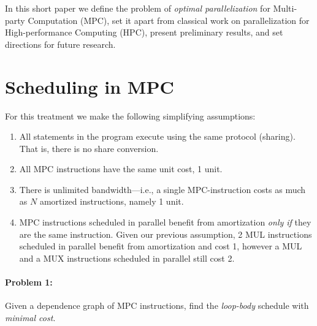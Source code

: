 \documentclass[sigconf, screen, natbib=false, dvipsnames, table]{acmart}
\theoremstyle{definition}
\begin{document}
In this short paper we define the problem of \emph{optimal parallelization} for Multi-party Computation (MPC), 
set it apart from classical work on parallelization for High-performance Computing (HPC), present preliminary 
results, and set directions for future research. 






\section{Scheduling in MPC}

For this treatment we make the following simplifying assumptions:

\begin{enumerate}
\item All statements in the program execute using the same protocol (sharing). That is, there is no share conversion.
\item All MPC instructions have the same unit cost, 1 unit.
\item There is unlimited bandwidth---i.e., a single MPC-instruction costs as much as $N$ amortized instructions, namely 1 unit.
\item MPC instructions scheduled in parallel benefit from amortization \emph{only if} they are the same instruction. Given our previous assumption, 
2 MUL instructions scheduled in parallel benefit from amortization and cost 1, however a MUL and a MUX instructions scheduled 
in parallel still cost 2.
\end{enumerate}

\paragraph{Problem 1:} Given a dependence graph of MPC instructions, find the \emph{loop-body} schedule 
with \emph{minimal cost}.
\end{document}
